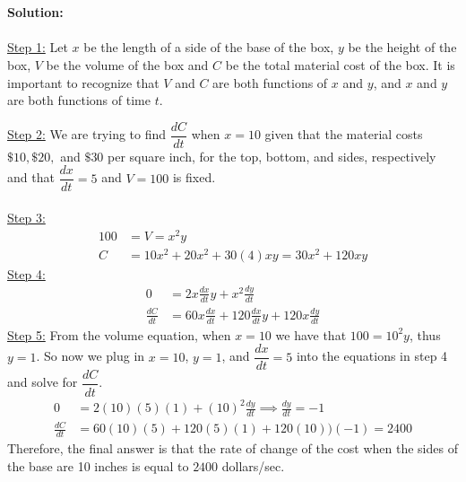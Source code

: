 \documentclass[reqno,psamsfonts]{amsart}
\theoremstyle{definition}
\theoremstyle{remark}
\numberwithin{equation}{section}
\begin{document}
\begin{enumerate}
\\
\\\textbf{Solution:} 
\\
\\\underline{Step 1:} Let $x$ be the length of a side of the base of the box, $y$ be the height of the box, $V$ be the volume of the box and $C$ be the total material cost of the box. It is important to recognize that $V$ and $C$ are both functions of $x$ and $y$, and $x$ and $y$ are both functions of time $t$. 
\begin{center}
\end{center}
\underline{Step 2:} We are trying to find $\dfrac{dC}{dt}$ when $x=10$ given that the material costs $\$10, \$20,$ and $\$30$ per square inch, for the top, bottom, and sides, respectively and that $\dfrac{dx}{dt}=5$ and $V=100$ is fixed. 
\\
\\\underline{Step 3:} \begin{align*}
100&=V=x^2y\\
C&=10x^2 +20x^2 +30(4)xy=30x^2+120xy
\end{align*}
\underline{Step 4:}
\begin{align*}
0&=2x\frac{dx}{dt}y+x^2\frac{dy}{dt}\\
\frac{dC}{dt}&=60x\frac{dx}{dt}+120\frac{dx}{dt}y+120x\frac{dy}{dt}
\end{align*}
\underline{Step 5:} From the volume equation, when $x=10$ we have that $100=10^2y$, thus $y=1$. So now we plug in $x=10$, $y=1$, and $\dfrac{dx}{dt}=5$ into the equations in step 4 and solve for $\dfrac{dC}{dt}$. 
\begin{align*}
0&=2(10)(5)(1)+(10)^2\frac{dy}{dt}\implies \frac{dy}{dt} = -1\\
\frac{dC}{dt}&=60(10)(5)+120(5)(1)+120(10))(-1)=2400
\end{align*}
Therefore, the final answer is that the rate of change of the cost when the sides of the base are 10 inches is equal to $2400$ dollars/sec. 


\end{enumerate}
\end{document}
